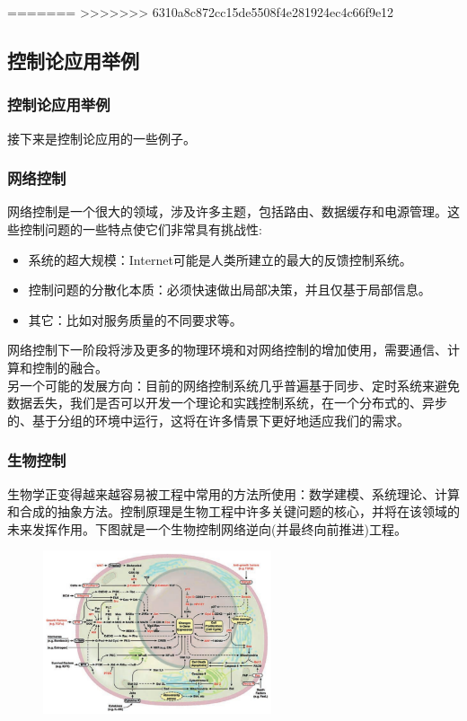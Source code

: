 \documentclass[12pt,AutoFakeBold,aspectratio=43,mathserif]{beamer}
\begin{document}
\begin{frame}
\begin{columns}
\begin{column}{.4\linewidth}
\begin{frame}
    \end{frame}
=======
>>>>>>> 6310a8c872cc15de5508f4e281924ec4c66f9e12
    \subsection{控制论应用举例}
    \begin{frame}
        \frametitle{控制论应用举例}
        接下来是控制论应用的一些例子。
    \end{frame}
    \begin{frame}
        \frametitle{网络控制}
        \footnotesize 网络控制是一个很大的领域，涉及许多主题，包括路由、数据缓存和电源管理。这些控制问题的一些特点使它们非常具有挑战性: \pause
        \begin{itemize}
            \item  系统的超大规模：Internet可能是人类所建立的最大的反馈控制系统。
            \item  控制问题的分散化本质：必须快速做出局部决策，并且仅基于局部信息。
            \item  其它：比如对服务质量的不同要求等。
        \end{itemize} \pause
        网络控制下一阶段将涉及更多的物理环境和对网络控制的增加使用，需要通信、计算和控制的融合。 \\ \pause
        另一个可能的发展方向：目前的网络控制系统几乎普遍基于同步、定时系统来避免数据丢失，我们是否可以开发一个理论和实践控制系统，在一个分布式的、异步的、基于分组的环境中运行，这将在许多情景下更好地适应我们的需求。
    \end{frame}
    \begin{frame}
        \frametitle{生物控制}
        \footnotesize 生物学正变得越来越容易被工程中常用的方法所使用：数学建模、系统理论、计算和合成的抽象方法。控制原理是生物工程中许多关键问题的核心，并将在该领域的未来发挥作用。下图就是一个生物控制网络逆向(并最终向前推进)工程。 \pause
        \begin{figure}[htbp]
            \setlength{\abovecaptionskip}{0.cm}
            \setlength{\belowcaptionskip}{-0.cm}
            \centering
            \vspace{-0.3cm}
            \setlength{\abovecaptionskip}{0.cm}
            \setlength{\belowcaptionskip}{-0.cm}
            \includegraphics[width=0.6\textwidth]{figures/3-4.png}
        \end{figure}
    \end{frame}

\end{column}
\end{columns}
\end{frame}
\end{document}
